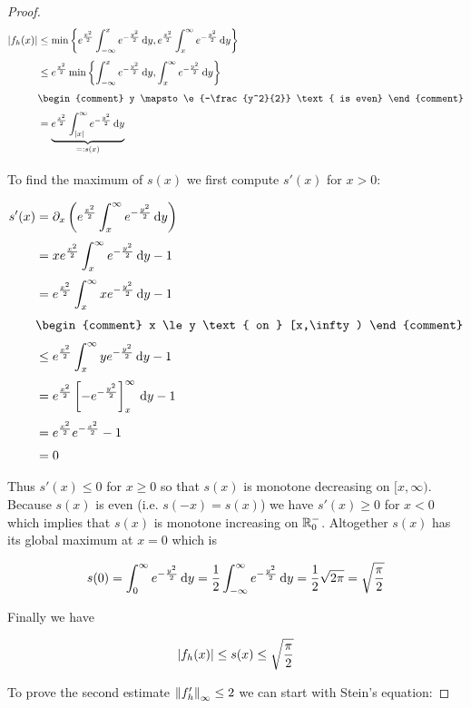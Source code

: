 \begin{proof}
  \begin{align}
    \abs{f_h(x)} & \le \min\left\{ \e{\frac{x^2}{2}} \int_{-\infty}^x \e{-\frac{y^2}{2}} \d{y}, \e{\frac{x^2}{2}} \int_x^\infty \e{-\frac{y^2}{2}} \d{y} \right\} \nl
    & \le \e{\frac{x^2}{2}} \min\left\{ \int_{-\infty}^x \e{-\frac{y^2}{2}} \d{y}, \int_x^\infty \e{-\frac{y^2}{2}} \d{y} \right\} \nl
    &
    \begin{comment}
      y \mapsto \e{-\frac{y^2}{2}} \text{ is even}
    \end{comment} \nl
    & = \underbrace{\e{\frac{x^2}{2}} \int_{\abs{x}}^\infty \e{-\frac{y^2}{2}} \d{y}}_{=: s(x)} \nl
  \end{align}

  \noindent To find the maximum of $s(x)$ we first compute $s'(x)$ for $x > 0$:

  \begin{align}
    s'(x) &= \partial_x \left( \e{\frac{x^2}{2}} \int_x^\infty \e{-\frac{y^2}{2}} \d{y} \right) \nl
    &= x\e{\frac{x^2}{2}} \int_x^\infty \e{-\frac{y^2}{2}} \d{y} - 1 \nl
    &= \e{\frac{x^2}{2}} \int_x^\infty x\e{-\frac{y^2}{2}} \d{y} - 1 \nl
    &
    \begin{comment}
      x \le y \text{ on } [x,\infty)
    \end{comment} \nl
    &\le \e{\frac{x^2}{2}} \int_x^\infty y\e{-\frac{y^2}{2}} \d{y} - 1 \nl
    &= \e{\frac{x^2}{2}} \left[-\e{-\frac{y^2}{2}}\right]_x^\infty \d{y} - 1 \nl
    &= \e{\frac{x^2}{2}} \e{-\frac{x^2}{2}} - 1 \nl
    &= 0
  \end{align}

  Thus $s'(x) \le 0$ for $x \ge 0$ so that $s(x)$ is monotone decreasing on $[x,\infty)$. Because $s(x)$ is even (i.e. $s(-x)=s(x)$) we have $s'(x) \ge 0$ for $x < 0$ which implies that $s(x)$ is monotone increasing on $\mathbb R^{-}_0$. Altogether $s(x)$ has its global maximum at $x=0$ which is

  \begin{align}
    s(0) = \int_0^\infty e^{-\frac{y^2}{2}} \,\mathrm d{y} = \frac{1}{2} \int_{-\infty}^\infty e^{-\frac{y^2}{2}} \,\mathrm d{y} = \frac{1}{2} \sqrt{2\pi} = \sqrt{\frac{\pi}{2}}
  \end{align}

  \noindent Finally we have

  \begin{align}
    \left|{f_h(x)}\right| \le s(x) \le \sqrt{\frac \pi 2}
  \end{align}

  \noindent To prove the second estimate $\left\|{f_h'}\right\|_\infty \le 2$ we can start with Stein's equation:


\end{proof}
